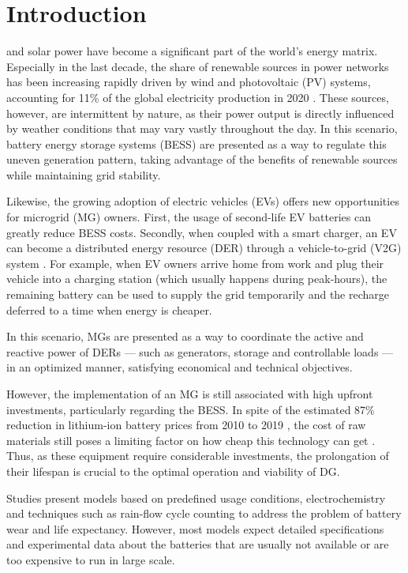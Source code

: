 \documentclass{ieeeaccess}
\begin{document}
\section{Introduction}
\label{sec:introduction}
     and solar power have become a significant part of the world's energy matrix. Especially in the last decade, the share of renewable sources in power networks has been increasing rapidly driven by wind and photovoltaic (PV) systems, accounting for 11\% of the global electricity production in 2020 \cite{KOCER2019}\cite{EMBER2021}. These sources, however, are intermittent by nature, as their power output is directly influenced by weather conditions that may vary vastly throughout the day. In this scenario, battery energy storage systems (BESS) are presented as a way to regulate this uneven generation pattern, taking advantage of the benefits of renewable sources while maintaining grid stability.

    Likewise, the growing adoption of electric vehicles (EVs) offers new opportunities for microgrid (MG) owners. First, the usage of second-life EV batteries can greatly reduce BESS costs. Secondly, when coupled with a smart charger, an EV can become a distributed energy resource (DER) through a vehicle-to-grid (V2G) system \cite{KEELI2012}. For example, when EV owners arrive home from work and plug their vehicle into a charging station (which usually happens during peak-hours), the remaining battery can be used to supply the grid temporarily and the recharge deferred to a time when energy is cheaper.

    In this scenario, MGs are presented as a way to coordinate the active and reactive power of DERs --- such as generators, storage and controllable loads --- in an optimized manner, satisfying economical and technical objectives.

    However, the implementation of an MG is still associated with high upfront investments, particularly regarding the BESS. In spite of the estimated 87\% reduction in lithium-ion battery prices from 2010 to 2019 \cite{BBERG2019}, the cost of raw materials still poses a limiting factor on how cheap this technology can get \cite{HSIEH2019}. Thus, as these equipment require considerable investments, the prolongation of their lifespan is crucial to the optimal operation and viability of DG.

    Studies \cite{ECKER2014,NARAYAN2018,DIMEASHATZIARGYRIOU2005,MARYAMA2013} present models based on predefined usage conditions, electrochemistry and techniques such as rain-flow cycle counting to address the problem of battery wear and life expectancy. However, most models expect detailed specifications and experimental data about the batteries that are usually not available or are too expensive to run in large scale.
\end{document}
